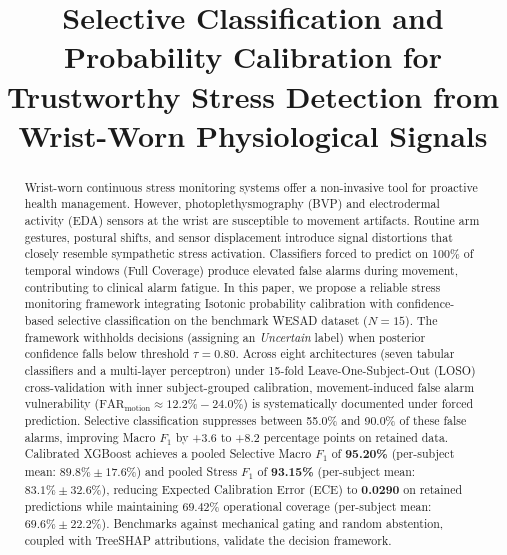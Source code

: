 \documentclass[conference]{IEEEtran}
\begin{document}
\title{Selective Classification and Probability Calibration for Trustworthy Stress Detection from Wrist-Worn Physiological Signals}

\author{
}

\maketitle

\begin{abstract}
Wrist-worn continuous stress monitoring systems offer a non-invasive tool for proactive health management. However, photoplethysmography (BVP) and electrodermal activity (EDA) sensors at the wrist are susceptible to movement artifacts. Routine arm gestures, postural shifts, and sensor displacement introduce signal distortions that closely resemble sympathetic stress activation. Classifiers forced to predict on 100\% of temporal windows (Full Coverage) produce elevated false alarms during movement, contributing to clinical alarm fatigue. In this paper, we propose a reliable stress monitoring framework integrating Isotonic probability calibration with confidence-based selective classification on the benchmark WESAD dataset ($N=15$). The framework withholds decisions (assigning an \textit{Uncertain} label) when posterior confidence falls below threshold $\tau = 0.80$. Across eight architectures (seven tabular classifiers and a multi-layer perceptron) under 15-fold Leave-One-Subject-Out (LOSO) cross-validation with inner subject-grouped calibration, movement-induced false alarm vulnerability ($\text{FAR}_{\text{motion}} \approx 12.2\% - 24.0\%$) is systematically documented under forced prediction. Selective classification suppresses between 55.0\% and 90.0\% of these false alarms, improving Macro $F_1$ by +3.6 to +8.2 percentage points on retained data. Calibrated XGBoost achieves a pooled Selective Macro $F_1$ of \textbf{95.20\%} (per-subject mean: $89.8\% \pm 17.6\%$) and pooled Stress $F_1$ of \textbf{93.15\%} (per-subject mean: $83.1\% \pm 32.6\%$), reducing Expected Calibration Error (ECE) to \textbf{0.0290} on retained predictions while maintaining $69.42\%$ operational coverage (per-subject mean: $69.6\% \pm 22.2\%$). Benchmarks against mechanical gating and random abstention, coupled with TreeSHAP attributions, validate the decision framework.
\end{abstract}
\end{document}
